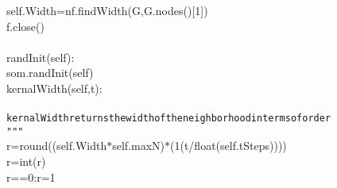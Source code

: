 {{\begin{tabbing}
\hspace{72pt}self.Width\hspace{6pt}=\hspace{6pt}nf.findWidth(G,G.nodes(){[}\dash{}1{]})\hspace{6pt}\\
\hspace{72pt}f.close()\\
\\
\hspace{6pt}randInit(self):\\
\hspace{48pt}som.randInit(self)\\
\hspace{6pt}kernalWidth(self,t):\\
\\
{\texttt{\hspace{48pt}kernalWidth\hspace{6pt}returns\hspace{6pt}the\hspace{6pt}width\hspace{6pt}of\hspace{6pt}the\hspace{6pt}neighborhood\hspace{6pt}in\hspace{6pt}terms\hspace{6pt}of\hspace{6pt}order}}\\
{\texttt{\hspace{48pt}\string"}}{\texttt{\string"\string"}}\\
\hspace{48pt}r\hspace{6pt}=\hspace{6pt}round((self.Width$\ast$self.maxN)\hspace{6pt}$\ast$\hspace{6pt}(1\hspace{6pt}\dash{}\hspace{6pt}(t/float(self.tSteps))))\\
\hspace{48pt}r\hspace{6pt}=\hspace{6pt}int(r)\\
\hspace{6pt}r\hspace{6pt}==\hspace{6pt}0:\hspace{6pt}r\hspace{6pt}=\hspace{6pt}1\\

\end{tabbing}}}
